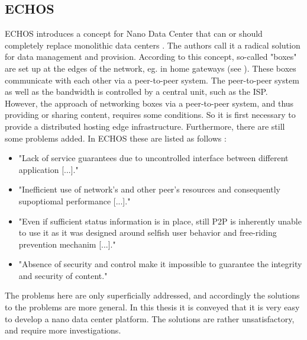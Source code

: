 \subsection{ECHOS}
ECHOS introduces a concept for Nano Data Center that can or should completely replace monolithic data centers \cite{Laoutaris:2008:EEC:1341431.1341442}. The authors call it a radical solution for data management and provision.
According to this concept, so-called "boxes" are set up at the edges of the network, eg. in home gateways (see \cite{technicolor}). These boxes communicate with each other via a peer-to-peer system. The peer-to-peer system as well as the bandwidth is controlled by a central unit, such as the ISP. However, the approach of networking boxes via a peer-to-peer system, and thus providing or sharing content, requires some conditions. So it is first necessary to provide a distributed hosting edge infrastructure. Furthermore, there are still some problems added. In ECHOS these are listed as follows \cite{Laoutaris:2008:EEC:1341431.1341442}:
\begin{itemize}
	\item "Lack of service guarantees due to uncontrolled interface between different application [...]."
	\item "Inefficient use of network's and other peer's resources and consequently supoptiomal performance [...]."
	\item "Even if sufficient status information is in place, still P2P is inherently unable to use it as it was designed around selfish user behavior and free-riding prevention mechanim [...]."
	\item "Absence of security and control make it impossible to guarantee the integrity and security of content."
\end{itemize}
The problems here are only superficially addressed, and accordingly the solutions to the problems are more general. In this thesis it is conveyed that it is very easy to develop a nano data center platform. The solutions are rather unsatisfactory, and require more investigations.